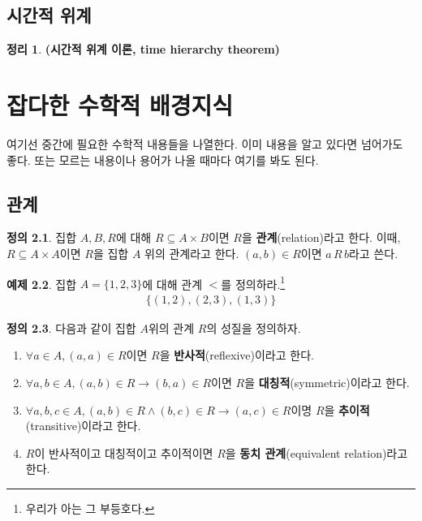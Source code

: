 \documentclass[b5paper, 11pt]{book}
\theoremstyle{definition}
\newtheorem{defn}{정의}[chapter]
\newtheorem{thm}[defn]{정리}
\newtheorem{ex}[defn]{예제}
\newenvironment{pf*}{\pushQED{\qed}\pf}
{\popQED\endpf}
\begin{document}
\section{시간적 위계}
\begin{thm}
    \textbf{(시간적 위계 이론, time hierarchy theorem)}
\end{thm}
\begin{pf*}
    
\end{pf*}
\appendix
\chapter{잡다한 수학적 배경지식}
여기선 중간에 필요한 수학적 내용들을 나열한다. 
이미 내용을 알고 있다면 넘어가도 좋다. 또는 모르는 내용이나 용어가 나올 때마다 여기를 
봐도 된다.
\section{관계}
\begin{defn}
    집합 $A, B, R$에 대해 $R \subseteq A \times B$이면 $R$을 \textbf{관계}(relation)라고 한다.
    이때, $R \subseteq A \times A$이면 $R$을 집합 $A$ 위의 관계라고 한다. 
    $(a, b) \in R$이면 $a \, R \, b$라고 쓴다.
\end{defn}
\begin{ex}
    집합 $A = \{1, 2, 3\}$에 대해 관계 $<$를 정의하라.\footnote{우리가 아는 그 부등호다.}
    \begin{align*}
        \{(1, 2), (2, 3), (1, 3)\}
    \end{align*}
\end{ex}
\begin{defn}
    다음과 같이 집합 $A$위의 관계 $R$의 성질을 정의하자.
    \begin{enumerate}
        \item $\forall a \in A, (a, a) \in R$이면 $R$을 \textbf{반사적}(reflexive)이라고 한다.
        \item $\forall a, b \in A, (a, b) \in R \rightarrow (b, a) \in R$이면
        $R$을 \textbf{대칭적}(symmetric)이라고 한다.
        \item $\forall a, b, c\in A, (a, b) \in R \wedge (b, c) \in R \rightarrow 
        (a, c) \in R$이명 $R$을 \textbf{추이적}(transitive)이라고 한다.
        \item $R$이 반사적이고 대칭적이고 추이적이면 $R$을 \textbf{동치 관계}(equivalent relation)라고
        한다.
    \end{enumerate}
\end{defn}
\end{document}
